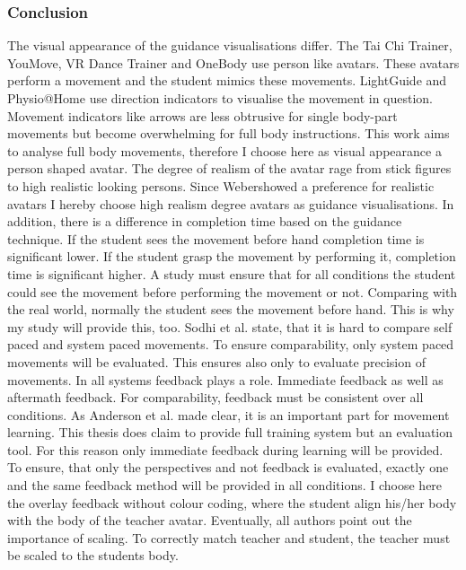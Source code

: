 \subsubsection{Conclusion}
The visual appearance of the guidance visualisations differ. The Tai Chi Trainer, YouMove, VR Dance Trainer and OneBody use person like avatars. These avatars perform a movement and the student mimics these movements. LightGuide and Physio@Home use direction indicators to visualise the movement in question. Movement indicators like arrows are less obtrusive for single body-part movements but become overwhelming for full body instructions. This work aims to analyse full body movements, therefore I choose here as visual appearance a person shaped avatar. The degree of realism of the avatar rage from stick figures to high realistic looking persons. Since Weber\todo showed a preference for realistic avatars I hereby choose high realism degree avatars as guidance visualisations. In addition, there is a difference in completion time based on the guidance technique. If the student sees the movement before hand completion time is significant lower. If the student grasp the movement by performing it, completion time is significant higher. A study must ensure that for all conditions the student could see the movement before performing the movement or not. Comparing with the real world, normally the student sees the movement before hand. This is why my study will provide this, too. Sodhi et al. state, that it is hard to compare self paced and system paced movements. To ensure comparability, only system paced movements will be evaluated. This ensures also only to evaluate precision of movements. In all systems feedback plays a role. Immediate feedback as well as aftermath feedback. For comparability, feedback must be consistent over all conditions. As Anderson et al. made clear, it is an important part for movement learning. This thesis does claim to provide full training system but an evaluation tool. For this reason only immediate feedback during learning will be provided. To ensure, that only the perspectives and not feedback is evaluated, exactly one and the same feedback method will be provided in all conditions. I choose here the overlay feedback without colour coding, where the student align his/her body with the body of the teacher avatar. Eventually, all authors point out the importance of scaling. To correctly match teacher and student, the teacher must be scaled to the students body.


